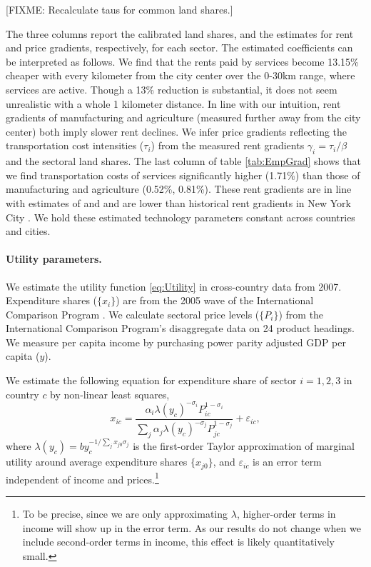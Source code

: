 \documentclass[12pt]{article}
\begin{document}
[FIXME: Recalculate taus for common land shares.]

The three columns report the calibrated land shares, and the estimates for rent and price gradients, respectively, for each sector. The estimated coefficients can be interpreted as follows. We find that the rents paid by services become 13.15\% cheaper with every kilometer from the city center over the 0-30km range, where services are active. Though a 13\% reduction is substantial, it does not seem unrealistic with a whole 1 kilometer distance. In line with our intuition, rent gradients of manufacturing and agriculture (measured further away from the city center) both imply slower rent declines. We infer price gradients reflecting the transportation cost intensities ($\tau_i$) from the measured rent gradients $\gamma_i=\tau_i/\beta$ and the sectoral land shares. The last column of table \ref{tab:EmpGrad} shows that we find transportation costs of services significantly higher (1.71\%) than those of manufacturing and agriculture (0.52\%, 0.81\%). These rent gradients are in line with estimates of  and  and are lower than historical rent gradients in New York City \cite{Atack1998}. We hold these estimated technology parameters constant across countries and cities. 

\paragraph{Utility parameters.}
We estimate the utility function \eqref{eq:Utility} in cross-country data from 2007. Expenditure shares ($\{x_i\}$) are from the 2005 wave of the International Comparison Program \cite{icp}. We calculate sectoral price levels ($\{P_i\}$) from the International Comparison Program's disaggregate data on 24 product headings. We measure per capita income by purchasing power parity adjusted GDP per capita ($y$).

We estimate the following equation for expenditure share of sector $i=1,2,3$ in country $c$ by non-linear least squares,
\begin{equation}\label{eq:estimable:utility}
	x_{ic} =
	\frac 	{\alpha_i \lambda(y_c)^{-\sigma_i}  P_{ic}^{1-\sigma_i}}
			{\sum_j {\alpha_j \lambda(y_c)^{-\sigma_j}  P_{jc}^{1-\sigma_j}}}
	+ \varepsilon_{ic},
\end{equation}
where $\lambda(y_c) = by_c^{-1/\sum_j x_{j0}\sigma_j}$ is the first-order Taylor approximation of marginal utility around average expenditure shares $\{x_{j0}\}$, and $\varepsilon_{ic}$ is an error term independent of income and prices.\footnote{To be precise, since we are only approximating $\lambda$, higher-order terms in income will show up in the error term. As our results do not change when we include second-order terms in income, this effect is likely quantitatively small.}
\end{document}
